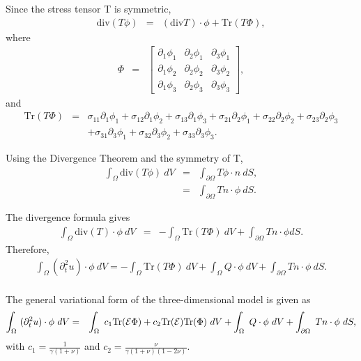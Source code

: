 \documentclass[../../main.tex]{subfiles}
\begin{document}
Since the stress tensor T is symmetric,
\begin{eqnarray*}
	\textrm{div}(T\phi) & = & (\textrm{div}T)\cdot \phi + \textrm{Tr}(T\Phi),
\end{eqnarray*}
where
\begin{eqnarray*}
	\Phi & = &
	\begin{bmatrix}
		\partial_1 \phi_1 & \partial_2 \phi_1 & \partial_3 \phi_1 \\
		\partial_1 \phi_2 & \partial_2 \phi_2 & \partial_3 \phi_2 \\
		\partial_1 \phi_3 & \partial_2 \phi_3 & \partial_3 \phi_3
	\end{bmatrix},
\end{eqnarray*}
and
\begin{eqnarray*}
	\textrm{Tr}(T\Phi) & = & \sigma_{11} \partial_1\phi_1 + \sigma_{12}\partial_1 \phi_2 + \sigma_{13}\partial_1 \phi_3 + \sigma_{21}\partial_2 \phi_1 + \sigma_{22}\partial_2\phi_2 + \sigma_{23}\partial_2 \phi_3 \nonumber \\ & & + \sigma_{31}\partial_3 \phi_1 + \sigma_{32}\partial_3\phi_2 + \sigma_{33}\partial_3 \phi_3. \label{Trc}
\end{eqnarray*}

Using the Divergence Theorem and the symmetry of T,
\begin{eqnarray*}
	\int_{\Omega} \textrm{div}(T\phi) \ dV & = & \int_{\partial \Omega} T\phi \cdot n \ dS,\\ & = & \int_{\partial \Omega} Tn \cdot \phi \ dS.
\end{eqnarray*}

The divergence formula gives
\begin{eqnarray*}
	\int_{\Omega} \textrm{div}(T)\cdot \phi \ dV & = & -\int_{\Omega} \textrm{Tr}(T\Phi) \ dV + \int_{\partial \Omega} Tn\cdot \phi dS.
\end{eqnarray*}
Therefore,
\begin{align*}
	\int_{\Omega} (\partial_t^2 u)\cdot \phi \ dV = -\int_{\Omega} \textrm{Tr}(T\Phi) \ dV +
	\int_{\Omega} Q\cdot\phi \ dV + \int_{\partial \Omega} Tn\cdot \phi \ dS.
\end{align*}
\\

The general variational form of the three-dimensional model is given as
\begin{eqnarray*}
	\int_\Omega~ (\partial^2_t u) \cdot \phi~dV & = & \int_\Omega~c_1\textrm{Tr}({\cal E}\Phi)+
	c_2\textrm{Tr}({\cal E}) \textrm{Tr}(\Phi) ~dV + \int_\Omega~ Q \cdot \phi~dV +
	\int_{\partial \Omega}~Tn \cdot \phi~dS,
\end{eqnarray*}
with $ \displaystyle c_1 = \frac{1}{\gamma(1+\nu)}$ and $\displaystyle c_2 = \frac{\nu}{\gamma(1+\nu)(1-2\nu)}$.\\
\end{document}

